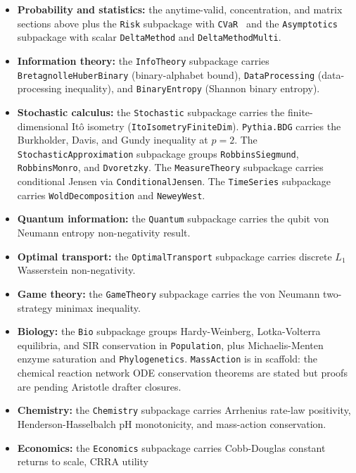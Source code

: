 \begin{itemize}[leftmargin=1.3em,itemsep=0.2em]
\item \textbf{Probability and statistics:} the anytime-valid,
  concentration, and matrix sections above plus the \texttt{Risk}
  subpackage with \texttt{CVaR}~\citep{rockafellaruryasev2000} and
  the \texttt{Asymptotics} subpackage with scalar
  \texttt{DeltaMethod} and \texttt{DeltaMethodMulti}.
\item \textbf{Information theory:} the \texttt{InfoTheory}
  subpackage carries \texttt{BretagnolleHuberBinary}
  (binary-alphabet bound), \texttt{DataProcessing} (data-processing
  inequality), and \texttt{BinaryEntropy} (Shannon binary entropy).
\item \textbf{Stochastic calculus:} the \texttt{Stochastic}
  subpackage carries the finite-dimensional Itô isometry
  (\texttt{ItoIsometryFiniteDim}). \texttt{Pythia.BDG} carries the
  Burkholder, Davis, and Gundy inequality at $p = 2$. The
  \texttt{StochasticApproximation} subpackage groups
  \texttt{RobbinsSiegmund}, \texttt{RobbinsMonro}, and
  \texttt{Dvoretzky}. The \texttt{MeasureTheory} subpackage carries
  conditional Jensen via \texttt{ConditionalJensen}. The \texttt{TimeSeries} subpackage
  carries \texttt{WoldDecomposition} \citep{wold1938} and
  \texttt{NeweyWest}.
\item \textbf{Quantum information:} the \texttt{Quantum}
  subpackage carries the qubit von Neumann entropy
  non-negativity result.
\item \textbf{Optimal transport:} the \texttt{OptimalTransport}
  subpackage carries discrete $L_1$ Wasserstein non-negativity.
\item \textbf{Game theory:} the \texttt{GameTheory} subpackage
  carries the von Neumann two-strategy minimax inequality.
\item \textbf{Biology:} the \texttt{Bio} subpackage groups
  Hardy-Weinberg, Lotka-Volterra equilibria, and SIR conservation
  in \texttt{Population}, plus Michaelis-Menten enzyme saturation
  and \texttt{Phylogenetics}. \texttt{MassAction} is in scaffold:
  the chemical reaction network ODE conservation theorems are
  stated but proofs are pending Aristotle drafter
  closures.
\item \textbf{Chemistry:} the \texttt{Chemistry} subpackage
  carries Arrhenius rate-law positivity, Henderson-Hasselbalch
  pH monotonicity, and mass-action conservation.
\item \textbf{Economics:} the \texttt{Economics} subpackage
  carries Cobb-Douglas constant returns to scale, CRRA utility

\end{itemize}
